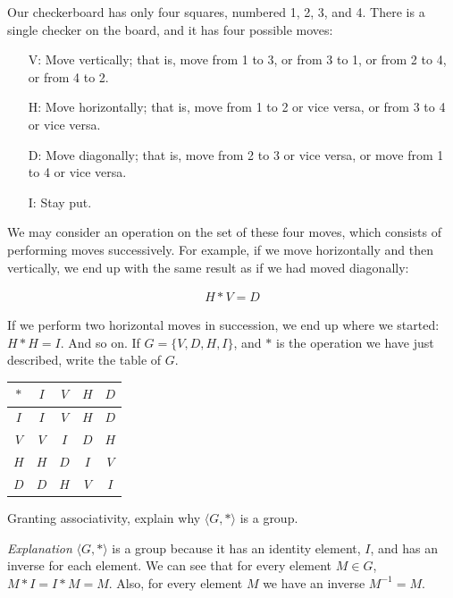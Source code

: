 \documentclass[twoside]{amsart}
\begin{document}
\begin{enumerate}[A.]
   \noindent Our checkerboard has only four squares, numbered 1, 2, 3, and 4.
   There is a single checker on the board, and it has four possible moves:

   \begin{enumerate}
      \item[V:] Move vertically; that is, move from 1 to 3, or from 3 to 1, or
      from 2 to 4, or from 4 to 2. 
      \item[H:] Move horizontally; that is, move from 1 to 2 or vice versa,
      or from 3 to 4 or vice versa.
      \item[D:] Move diagonally; that is, move from 2 to 3 or vice versa, or
      move from 1 to 4 or vice versa.
      \item[I:] Stay put.
   \end{enumerate}

   \noindent We may consider an operation on the set of these four moves, which
   consists of performing moves successively. For example, if we move
   horizontally and then vertically, we end up with the same result as if we
   had moved diagonally:

   \begin{gather*}
      H * V = D
   \end{gather*}

   \noindent If we perform two horizontal moves in succession, we end up where
   we started: $H*H=I$. And so on. If $G=\{V,D,H,I\}$, and $*$ is the operation
   we have just described, write the table of $G$.

   \begin{center}
   \begin{tabular}{c|cccc}
      $*$ & $I$ & $V$ & $H$ & $D$ \\ \hline
      $I$ & $I$ & $V$ & $H$ & $D$ \\
      $V$ & $V$ & $I$ & $D$ & $H$ \\
      $H$ & $H$ & $D$ & $I$ & $V$ \\
      $D$ & $D$ & $H$ & $V$ & $I$
   \end{tabular}
   \end{center}
   
   \noindent Granting associativity, explain why $\langle G,* \rangle$ is a
   group.

   \emph{Explanation} $\langle G,* \rangle$ is a group because
   it has an identity element, $I$, and has an inverse for each element.
   We can see that for every element $M \in G$, $M * I = I * M = M$.
   Also, for every element $M$ we have an inverse $M^{-1} = M$.


\end{enumerate}
\end{document}
